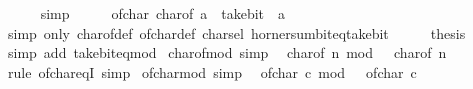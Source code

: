 \begin{isabellebody}
\ \ \ \ \isamarkupfalse%
\ simp\isanewline
\ \ \isamarkupfalse%
\ \isamarkupfalse%
\ {\isacartoucheopen}of{\isacharunderscore}{\kern0pt}char\ {\isacharparenleft}{\kern0pt}char{\isacharunderscore}{\kern0pt}of\ a{\isacharparenright}{\kern0pt}\ {\isacharequal}{\kern0pt}\ take{\isacharunderscore}{\kern0pt}bit\ {}\ a{\isacartoucheclose}\isanewline
\ \ \ \ \isamarkupfalse%
\ {\isacharparenleft}{\kern0pt}simp\ only{\isacharcolon}{\kern0pt}\ char{\isacharunderscore}{\kern0pt}of{\isacharunderscore}{\kern0pt}def\ of{\isacharunderscore}{\kern0pt}char{\isacharunderscore}{\kern0pt}def\ char{\isachardot}{\kern0pt}sel\ horner{\isacharunderscore}{\kern0pt}sum{\isacharunderscore}{\kern0pt}bit{\isacharunderscore}{\kern0pt}eq{\isacharunderscore}{\kern0pt}take{\isacharunderscore}{\kern0pt}bit{\isacharparenright}{\kern0pt}\isanewline
\ \ \isamarkupfalse%
\ \isamarkupfalse%
\ {\isacharquery}{\kern0pt}thesis\isanewline
\ \ \ \ \isamarkupfalse%
\ {\isacharparenleft}{\kern0pt}simp\ add{\isacharcolon}{\kern0pt}\ take{\isacharunderscore}{\kern0pt}bit{\isacharunderscore}{\kern0pt}eq{\isacharunderscore}{\kern0pt}mod{\isacharparenright}{\kern0pt}\isanewline
{}\isamarkupfalse%
%
\endisatagproof
{\isafoldproof}%
%
\isadelimproof
\isanewline
%
\endisadelimproof
\isanewline
{}\isamarkupfalse%
\ char{\isacharunderscore}{\kern0pt}of{\isacharunderscore}{\kern0pt}mod{\isacharunderscore}{\kern0pt}{}{}{}\ {\isacharbrackleft}{\kern0pt}simp{\isacharbrackright}{\kern0pt}{\isacharcolon}{\kern0pt}\isanewline
\ \ {\isacartoucheopen}char{\isacharunderscore}{\kern0pt}of\ {\isacharparenleft}{\kern0pt}n\ mod\ {}{}{}{\isacharparenright}{\kern0pt}\ {\isacharequal}{\kern0pt}\ char{\isacharunderscore}{\kern0pt}of\ n{\isacartoucheclose}\isanewline
%
\isadelimproof
\ \ %
\endisadelimproof
%
\isatagproof
{}\isamarkupfalse%
\ {\isacharparenleft}{\kern0pt}rule\ of{\isacharunderscore}{\kern0pt}char{\isacharunderscore}{\kern0pt}eqI{\isacharparenright}{\kern0pt}\ simp%
\endisatagproof
{\isafoldproof}%
%
\isadelimproof
\isanewline
%
\endisadelimproof
\isanewline
{}\isamarkupfalse%
\ of{\isacharunderscore}{\kern0pt}char{\isacharunderscore}{\kern0pt}mod{\isacharunderscore}{\kern0pt}{}{}{}\ {\isacharbrackleft}{\kern0pt}simp{\isacharbrackright}{\kern0pt}{\isacharcolon}{\kern0pt}\isanewline
\ \ {\isacartoucheopen}of{\isacharunderscore}{\kern0pt}char\ c\ mod\ {}{}{}\ {\isacharequal}{\kern0pt}\ of{\isacharunderscore}{\kern0pt}char\ c{\isacartoucheclose}\isanewline

\end{isabellebody}
